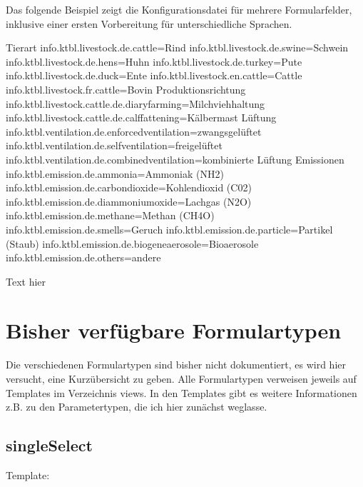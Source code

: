 \documentclass[letterpaper,10pt,ngerman]{sphinxmanual}
\begin{document}
Das folgende Beispiel zeigt die Konfigurationsdatei für mehrere Formularfelder, inklusive einer ersten Vorbereitung für unterschiedliche Sprachen.

\begin{sphinxVerbatim}[commandchars=\\\{\}]
\PYGZsh{} Tierart
info.ktbl.livestock.de.cattle=Rind
info.ktbl.livestock.de.swine=Schwein
info.ktbl.livestock.de.hens=Huhn
info.ktbl.livestock.de.turkey=Pute
info.ktbl.livestock.de.duck=Ente
info.ktbl.livestock.en.cattle=Cattle
info.ktbl.livestock.fr.cattle=Bovin
\PYGZsh{} Produktionsrichtung
info.ktbl.livestock.cattle.de.diary\PYGZus{}farming=Milchviehhaltung
info.ktbl.livestock.cattle.de.calf\PYGZus{}fattening=Kälbermast
\PYGZsh{} Lüftung
info.ktbl.ventilation.de.enforced\PYGZus{}ventilation=zwangsgelüftet
info.ktbl.ventilation.de.self\PYGZus{}ventilation=freigelüftet
info.ktbl.ventilation.de.combined\PYGZus{}ventilation=kombinierte Lüftung
\PYGZsh{} Emissionen
info.ktbl.emission.de.ammonia=Ammoniak (NH2)
info.ktbl.emission.de.carbondioxide=Kohlendioxid (C02)
info.ktbl.emission.de.diammoniumoxide=Lachgas (N2O)
info.ktbl.emission.de.methane=Methan (CH4O)
info.ktbl.emission.de.smells=Geruch
info.ktbl.emission.de.particle=Partikel (Staub)
info.ktbl.emission.de.biogene\PYGZus{}aerosole=Bioaerosole
info.ktbl.emission.de.others=andere
\end{sphinxVerbatim}

Text hier
\begin{quote}
\end{quote}


\chapter{Bisher verfügbare Formulartypen}
\label{\detokenize{developer-docs/availableForms:bisher-verfugbare-formulartypen}}\label{\detokenize{developer-docs/availableForms::doc}}
Die verschiedenen Formulartypen sind bisher nicht dokumentiert, es wird hier versucht, eine Kurzübersicht zu geben.
Alle Formulartypen verweisen jeweils auf Templates im Verzeichnis views. In den Templates gibt es weitere Informationen z.B. zu den Parametertypen, die ich hier zunächst weglasse.


\section{singleSelect}
\label{\detokenize{developer-docs/availableForms:singleselect}}
Template: 
\end{document}

